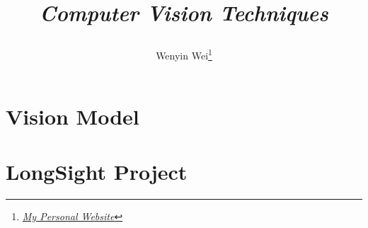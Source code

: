 \documentclass[10pt]{article}
\title{\begin{center}{\Huge \textit{Computer Vision Techniques}}\end{center}}
\author{Wenyin Wei\footnote{\href{https://wenyin.xyz/}{\textit{My Personal Website}}}}
\affiliation{
Tsinghua University\\
Department of Engineering Physics
}
\begin{document}
	\maketitle
	\flushbottom
	\newpage
	\pagestyle{fancynotes}

	\part{Vision Model}
	
	\part{LongSight Project}
	
	
	
	
\end{document}
